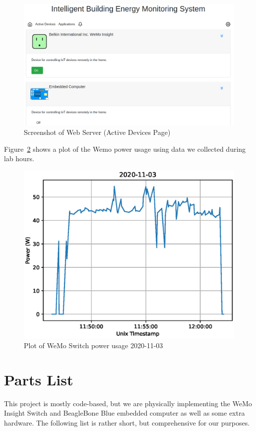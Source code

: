 \documentclass[letterpaper,12pt]{article}   %
\begin{document}
\begin{figure}
    \centering
    \includegraphics[scale=0.4]{figs/webServer/activeDevicesWithEmbeddedPicture.png}
    \caption{Screenshot of Web Server (Active Devices Page)}
    \label{fig:activeDevicesPageScreenCap}
\end{figure}

Figure~\ref{fig:powerPlotWeMoSwitch} shows a plot of the Wemo power usage using data we collected during lab hours.

\begin{figure}[H]
    \centering
    \includegraphics[scale=0.5]{figs/powerPlot2020-11-03.eps}
    \caption{Plot of WeMo Switch power usage 2020-11-03}
    \label{fig:powerPlotWeMoSwitch}
\end{figure}

\section{Parts List}
This project is mostly code-based, but we are physically implementing the WeMo Insight Switch and BeagleBone Blue embedded computer as well as some extra hardware. The following list is rather short, but comprehensive for our purposes.
\end{document}
